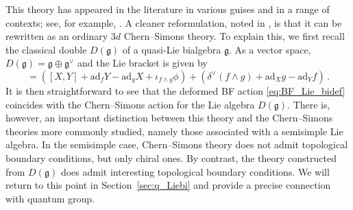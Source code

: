 \documentclass[11pt]{article}
\numberwithin{equation}{section}
\begin{document}
This theory has appeared in the literature in various guises and in a range of contexts; see, for example, \cite{roytenberg2007aksz,roytenberg2002structure,Dupuis:2020ndx,Chen:2022opt,cabrera2022dimensional}. A cleaner reformulation, noted in \cite{Chen:2022opt}, is that it can be rewritten as an ordinary $3d$ Chern--Simons theory. To explain this, we first recall the classical double $D(\mathfrak{g})$ of a quasi-Lie bialgebra $\mathfrak{g}$. As a vector space, $D(\mathfrak{g}) = \mathfrak{g}\oplus\mathfrak{g}^{\vee}$ and the Lie bracket is given by
\begin{equation}
	[X+f,Y+g] = ([X,Y] + \mathrm{ad}_fY -\mathrm{ad}_gX + \iota_{f\wedge g}\phi) + (\delta^{\vee}(f\wedge g) + \mathrm{ad}_Xg - \mathrm{ad}_Yf)\,.
\end{equation}
It is then straightforward to see that the deformed BF action \eqref{eq:BF_Lie_bidef} coincides with the Chern--Simons action for the Lie algebra $D(\mathfrak{g})$. There is, however, an important distinction between this theory and the Chern--Simons theories more commonly studied, namely those associated with a semisimple Lie algebra. In the semisimple case, Chern--Simons theory does not admit topological boundary conditions, but only chiral ones. By contrast, the theory constructed from $D(\mathfrak{g})$ does admit interesting topological boundary conditions. We will return to this point in Section~\ref{sec:q_Liebi} and provide a precise connection with quantum group.
\end{document}
